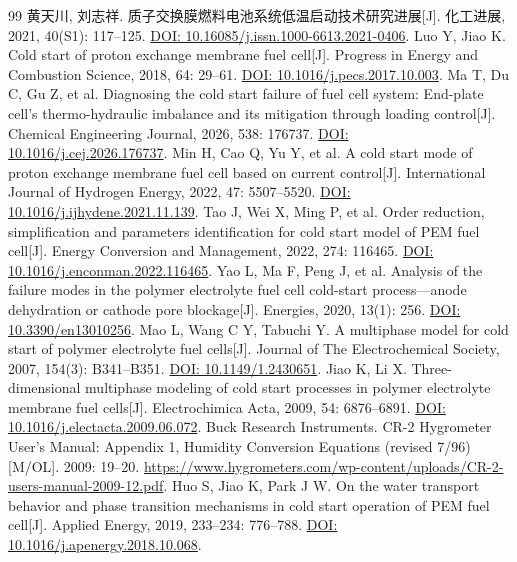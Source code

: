 \documentclass[bwprint]{gmcmthesis}
\numberwithin{equation}{section}
\numberwithin{figure}{section}
\begin{document}
\begin{thebibliography}{99}
\setlength{\itemsep}{1mm}
 黄天川, 刘志祥. 质子交换膜燃料电池系统低温启动技术研究进展[J]. 化工进展, 2021, 40(S1): 117--125. \href{https://doi.org/10.16085/j.issn.1000-6613.2021-0406}{DOI: 10.16085/j.issn.1000-6613.2021-0406}.
 Luo Y, Jiao K. Cold start of proton exchange membrane fuel cell[J]. Progress in Energy and Combustion Science, 2018, 64: 29--61. \href{https://doi.org/10.1016/j.pecs.2017.10.003}{DOI: 10.1016/j.pecs.2017.10.003}.
 Ma T, Du C, Gu Z, et al. Diagnosing the cold start failure of fuel cell system: End-plate cell's thermo-hydraulic imbalance and its mitigation through loading control[J]. Chemical Engineering Journal, 2026, 538: 176737. \href{https://doi.org/10.1016/j.cej.2026.176737}{DOI: 10.1016/j.cej.2026.176737}.
 Min H, Cao Q, Yu Y, et al. A cold start mode of proton exchange membrane fuel cell based on current control[J]. International Journal of Hydrogen Energy, 2022, 47: 5507--5520. \href{https://doi.org/10.1016/j.ijhydene.2021.11.139}{DOI: 10.1016/j.ijhydene.2021.11.139}.
 Tao J, Wei X, Ming P, et al. Order reduction, simplification and parameters identification for cold start model of PEM fuel cell[J]. Energy Conversion and Management, 2022, 274: 116465. \href{https://doi.org/10.1016/j.enconman.2022.116465}{DOI: 10.1016/j.enconman.2022.116465}.
 Yao L, Ma F, Peng J, et al. Analysis of the failure modes in the polymer electrolyte fuel cell cold-start process---anode dehydration or cathode pore blockage[J]. Energies, 2020, 13(1): 256. \href{https://doi.org/10.3390/en13010256}{DOI: 10.3390/en13010256}.
 Mao L, Wang C Y, Tabuchi Y. A multiphase model for cold start of polymer electrolyte fuel cells[J]. Journal of The Electrochemical Society, 2007, 154(3): B341--B351. \href{https://doi.org/10.1149/1.2430651}{DOI: 10.1149/1.2430651}.
 Jiao K, Li X. Three-dimensional multiphase modeling of cold start processes in polymer electrolyte membrane fuel cells[J]. Electrochimica Acta, 2009, 54: 6876--6891. \href{https://doi.org/10.1016/j.electacta.2009.06.072}{DOI: 10.1016/j.electacta.2009.06.072}.
 Buck Research Instruments. CR-2 Hygrometer User's Manual: Appendix 1, Humidity Conversion Equations (revised 7/96)[M/OL]. 2009: 19--20. \url{https://www.hygrometers.com/wp-content/uploads/CR-2-users-manual-2009-12.pdf}.
 Huo S, Jiao K, Park J W. On the water transport behavior and phase transition mechanisms in cold start operation of PEM fuel cell[J]. Applied Energy, 2019, 233--234: 776--788. \href{https://doi.org/10.1016/j.apenergy.2018.10.068}{DOI: 10.1016/j.apenergy.2018.10.068}.

\end{thebibliography}
\end{document}
